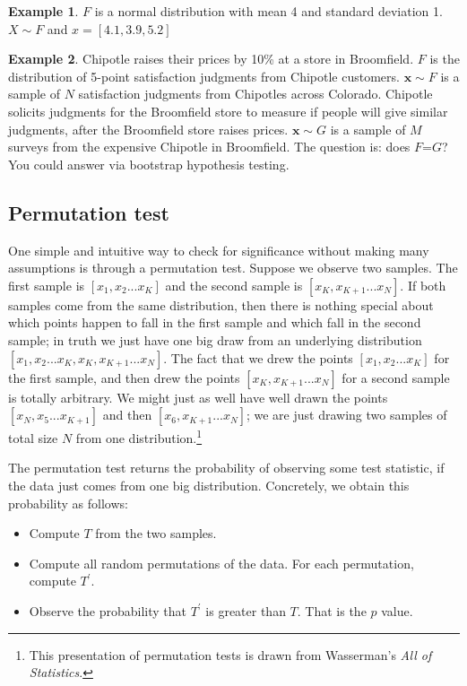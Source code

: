 \documentclass[]{article}
\theoremstyle{definition}
\newtheorem{exmp}{Example}[section]
\begin{document}
\begin{exmp}
$F$ is a normal distribution with mean 4 and standard deviation 1. $ {X} \sim F$ and ${x} = [4.1, 3.9, 5.2] $
\end{exmp}

\begin{exmp}
Chipotle raises their prices by 10\% at a store in Broomfield. $F$ is the distribution of 5-point satisfaction judgments from Chipotle customers. $\bm{x} \sim F$ is a sample of $N$ satisfaction judgments from Chipotles across Colorado. Chipotle solicits judgments for the Broomfield store to measure if people will give similar judgments, after the Broomfield store raises prices. $\bm{x} \sim G$ is a sample of $M$ surveys from the expensive Chipotle in Broomfield. The question is: does $F$=$G$? You could answer via bootstrap hypothesis testing.
\end{exmp}


\subsection{Permutation test}
One simple and intuitive way to check for significance without making many assumptions is through a permutation test. Suppose we observe two samples. The first sample is $[x_1, x_2 ... x_K]$ and the second sample is $[x_K, x_{K+1} ... x_N]$. If both samples come from the same distribution, then there is nothing special about which points happen to fall in the first sample and which fall in the second sample; in truth we just have one big draw from an underlying distribution $[x_1, x_2 ... x_K, x_K, x_{K+1} ... x_N]$. The fact that we drew the points $[x_1, x_2 ... x_K]$ for the first sample, and then drew the points $[x_K, x_{K+1} ... x_N]$ for a second sample is totally arbitrary. We might just as well have well drawn the points $[x_N, x_5 ... x_{K+1}]$ and then $[x_6, x_{K+1} ... x_N]$; we are just drawing two samples of total size $N$ from one distribution.\footnote{This presentation of permutation tests is drawn from Wasserman's \textit{All of Statistics}.} 

The permutation test returns the probability of observing some test statistic, if the data just comes from one big distribution. Concretely, we obtain this probability as follows: 

\begin{itemize}
\item Compute $T$ from the two samples.
\item Compute all random permutations of the data. For each permutation, compute $T^{\prime}$.
\item Observe the probability that $T^{\prime}$ is greater than $T$. That is the $p$ value.
\end{itemize}
\end{document}
